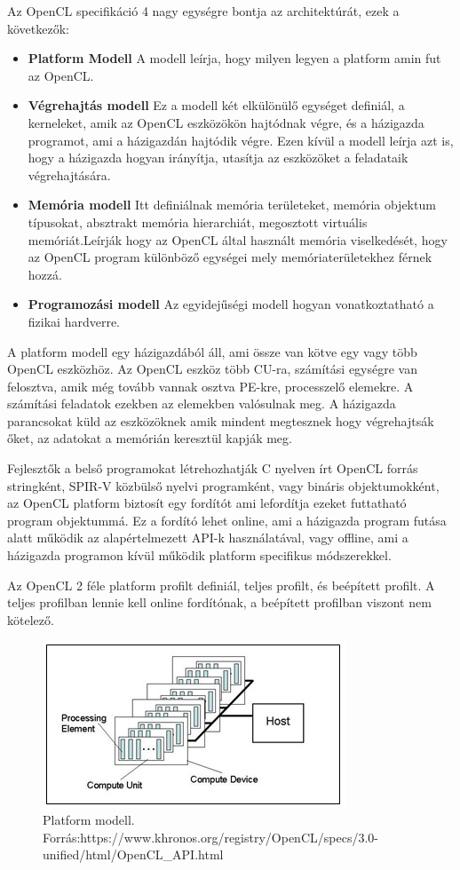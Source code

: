 Az OpenCL specifikáció 4 nagy egységre bontja az architektúrát, ezek a következők:
\begin{itemize}
\item \textbf{Platform Modell} A modell leírja, hogy milyen legyen a platform amin fut az OpenCL. 
\item \textbf{Végrehajtás modell} Ez a modell két elkülönülő egységet definiál, a kerneleket, amik az OpenCL eszközökön hajtódnak végre, és a házigazda programot, ami a házigazdán hajtódik végre. Ezen kívül a modell leírja azt is, hogy a házigazda hogyan irányítja, utasítja az eszközöket a feladataik végrehajtására.
\item \textbf{Memória modell} Itt definiálnak memória területeket,  memória objektum típusokat, absztrakt memória hierarchiát, megosztott virtuális memóriát.Leírják hogy az OpenCL által használt memória viselkedését, hogy az OpenCL program különböző egységei mely memóriaterületekhez férnek hozzá.
\item \textbf{Programozási modell} Az egyidejűségi modell hogyan vonatkoztatható a fizikai hardverre.

\end{itemize}

A platform modell egy házigazdából áll, ami össze van kötve egy vagy több OpenCL eszközhöz. Az OpenCL eszköz több CU-ra, számítási egységre van felosztva, amik még tovább vannak osztva PE-kre, processzelő elemekre. A számítási feladatok ezekben az elemekben valósulnak meg. A házigazda parancsokat küld az eszközöknek amik mindent megtesznek hogy végrehajtsák őket, az adatokat a memórián keresztül kapják meg. 

Fejlesztők a belső programokat létrehozhatják C nyelven írt OpenCL forrás stringként, SPIR-V közbülső nyelvi programként, vagy bináris objektumokként, az OpenCL platform biztosít egy fordítót ami lefordítja ezeket futtatható program objektummá. Ez a fordító lehet online, ami a házigazda program futása alatt működik az alapértelmezett API-k használatával, vagy offline, ami a házigazda programon kívül működik platform specifikus módszerekkel.

Az OpenCL 2 féle platform profilt definiál, teljes profilt, és beépített profilt. A teljes profilban lennie kell online fordítónak, a beépített profilban viszont nem kötelező.

\begin{figure}[h]
\centering
\includegraphics[scale=1.0]{images/platform_modell.jpg}
\caption{Platform modell. \\ Forrás:https://www.khronos.org/registry/OpenCL/specs/3.0-unified/html/OpenCL\_API.html}
\label{fig:platform_modell}
\end{figure}

